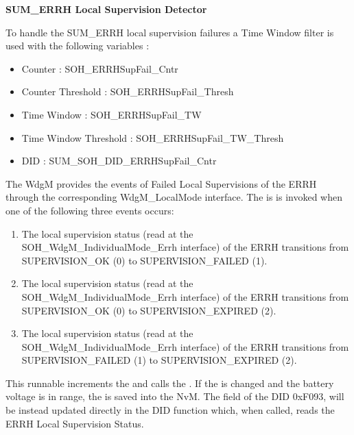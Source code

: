 {
    \textbf{SUM_ERRH Local Supervision Detector}
    
    
    To handle the SUM\_ERRH local supervision failures a Time Window filter is used  with the following variables :
    
    
    \begin{itemize}
        \item Counter               : SOH_ERRHSupFail_Cntr
        \item Counter Threshold     : SOH_ERRHSupFail_Thresh
        \item Time Window           : SOH_ERRHSupFail_TW
        \item Time Window Threshold : SOH_ERRHSupFail_TW_Thresh
        \item DID                   : SUM_SOH_DID_ERRHSupFail_Cntr
    \end{itemize}
    
}
{
       
}

{
The WdgM provides the events of Failed Local Supervisions of the ERRH through the corresponding WdgM\_LocalMode interface.
The \textbf{} is is invoked when one of the following three events occurs:
\begin{enumerate}
\item The local supervision status (read at the SOH\_WdgM\_IndividualMode\_Errh interface) of the ERRH transitions from SUPERVISION\_OK (0) to SUPERVISION\_FAILED (1).
\item The local supervision status (read at the SOH\_WdgM\_IndividualMode\_Errh interface) of the ERRH transitions from SUPERVISION\_OK (0) to SUPERVISION\_EXPIRED (2).
\item The local supervision status (read at the SOH\_WdgM\_IndividualMode\_Errh interface) of the ERRH transitions from SUPERVISION\_FAILED (1) to SUPERVISION\_EXPIRED (2).
\end{enumerate}

This runnable increments the  and calls the . If the  is changed and the battery voltage is in range, the  is saved into the NvM.
The  field of the DID 0xF093, will be instead updated directly in the DID function which, when called, reads the ERRH Local Supervision Status.
}
{
          
}  


